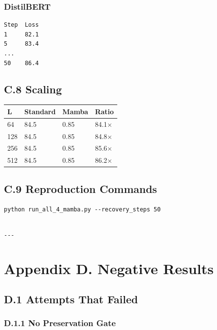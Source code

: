 \subsubsection{DistilBERT}
\begin{lstlisting}
Step  Loss
1     82.1
5     83.4
...
50    86.4
\end{lstlisting}

\subsection{C.8 Scaling}

\begin{table}[H]
\centering
\small
\begin{tabular}{llll}
\toprule
\textbf{L} & \textbf{Standard} & \textbf{Mamba} & \textbf{Ratio} \\
\midrule
64 & 84.5 & 0.85 & 84.1$\times$ \\
128 & 84.5 & 0.85 & 84.8$\times$ \\
256 & 84.5 & 0.85 & 85.6$\times$ \\
512 & 84.5 & 0.85 & 86.2$\times$ \\
\bottomrule
\end{tabular}
\end{table}

\subsection{C.9 Reproduction Commands}

\begin{lstlisting}
python run_all_4_mamba.py --recovery_steps 50
\end{lstlisting}
\begin{lstlisting}

---
\end{lstlisting}

\section{Appendix D. Negative Results}

\subsection{D.1 Attempts That Failed}

\subsubsection{D.1.1 No Preservation Gate}

